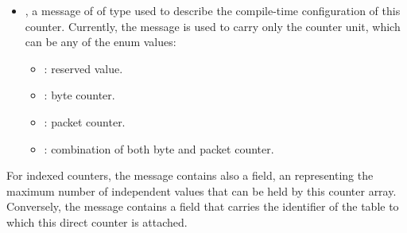 \documentclass[11pt]{article}
\begin{document}
{\begin{itemize}
\item{}
, a message of of type  used to describe the compile-time
configuration of this counter. Currently, the  message is used to
carry only the counter unit, which can be any of the  enum
values:%

\begin{itemize}[noitemsep,topsep=\mdcompacttopsep]%

\item{}: reserved value.%

\item{}: byte counter.%

\item{}: packet counter.%

\item{}: combination of both byte and packet counter.%
\end{itemize}%
\end{itemize}%

\noindent{}For indexed counters, the  message contains also a  field, an
 representing the maximum number of independent values that can be held
by this counter array. Conversely, the  message contains a
 field that carries the  identifier of the table to
which this direct counter is attached.%

}
\end{document}

